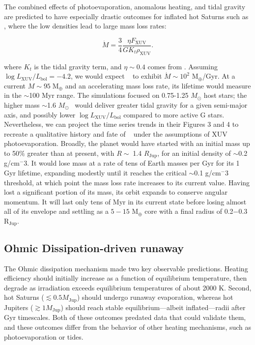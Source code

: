 \documentclass[twocolumn]{aastex631}
\newcommand{\hatp}{\object{HAT-P-67}~}
\newcommand{\hatpb}{\object{HAT-P-67 b}}
\begin{document}
The combined effects of photoevaporation, anomalous heating, and tidal gravity are predicted to have especially drastic outcomes for inflated hot Saturns \citep{2023ApJ...945L..36T} such as \hatpb, where the low densities lead to large mass loss rates:

\begin{equation}
    \dot{M} = \frac{3}{4}\frac{\eta F_\mathrm{XUV}}{G K_t \rho_\mathrm{XUV}}\label{thorn23Mdot}.
\end{equation}

\noindent where $K_t$ is the tidal gravity term, and $\eta \sim 0.4$ comes from \citet{2022A&A...663A.122C}.  Assuming $\log{L_\mathrm{XUV}/L_\mathrm{bol}}=-4.2$, we would expect \hatpb~ to exhibit $\dot{M}\sim10^2$ M$_\oplus$/Gyr. At a current $M\sim95\;$M$_\oplus$ and an accelerating mass loss rate, its lifetime would measure in the $\sim$100 Myr range.  The \citet{2023ApJ...945L..36T} simulations focused on 0.75-1.25 $M_\odot$ host stars; the higher mass $\sim$1.6 $M_\odot$ \hatp would deliver greater tidal gravity for a given semi-major axis, and possibly lower $\log{L_\mathrm{XUV}/L_\mathrm{bol}}$ compared to more active G stars.  Nevertheless, we can project the time series trends in their Figures 3 and 4 to recreate a qualitative history and fate of \hatpb~ under the assumptions of XUV photoevaporation.  Broadly, the planet would have started with an initial mass up to 50$\%$ greater than at present, with $R\sim\;$1.4 $R_\mathrm{Jup}$, for an initial density of $\sim$0.2 g/cm$^-3$.  It would lose mass at a rate of tens of Earth masses per Gyr for its 1 Gyr lifetime, expanding modestly until it reaches the critical $\sim$0.1 g/cm$^-3$ threshold, at which point the mass loss rate increases to its current value.  Having lost a significant portion of its mass, its orbit expands to conserve angular momentum.  It will last only tens of Myr in its current state before losing almost all of its envelope and settling as a $5-15$ M$_\oplus$ core with a final radius of 0.2$-$0.3 R$_\mathrm{Jup}$.


\subsection{Ohmic Dissipation-driven runaway}
The Ohmic dissipation mechanism made two key observable predictions.  Heating efficiency should initially increase as a function of equilibrium temperature, then degrade as irradiation exceeds equilibrium temperatures of about 2000 K.  Second, hot Saturns ($\lesssim0.5 M_\mathrm{Jup}$) should undergo runaway evaporation, whereas hot Jupiters ($\gtrsim 1 M_\mathrm{Jup}$) should reach stable equilibrium---albeit inflated---radii after Gyr timescales.  Both of these outcomes predated data that could validate them, and these outcomes differ from the behavior of other heating mechanisms, such as photoevaporation or tides.  
\end{document}
